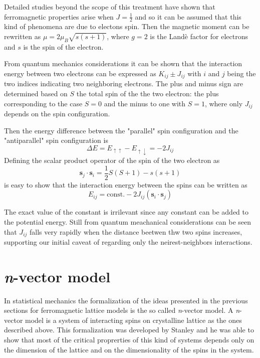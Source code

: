 Detailed studies beyond the scope of this treatment have shown that ferromagnetic
properties arise when $J=\frac{1}{2}$ and so it can be assumed that this kind of 
phenomena are due to electons spin. Then the magnetic moment can be rewritten as 
$\mu = 2 \mu_B \sqrt{s(s+1)}$, where $g=2$ is the Landè factor for electrons and
$s$ is the spin of the electron.

From quantum mechanics considerations \parencite[see][]{bransden2003physics}
it can be shown that the interaction energy between two electrons can be expressed
as $K_{ij} \pm J_{ij}$ with $i$ and $j$ being the two indices indicating two
neighboring electrons. The plus and minus sign are determined based on $S$ the 
total spin of the the two electron: the plus corresponding to the case $S=0$ and 
the minus to one with $S=1$, where only $J_{ij}$ depends on the spin configuration.

Then the energy difference between the "parallel" spin configuration and the 
"antiparallel" spin configuration is
$$\Delta E = E_{\uparrow\uparrow} - E_{\uparrow\downarrow} = -2J_{ij}$$
Defining the scalar product operator of the spin of the two electron as 
$$ \mathbf{s}_j \cdot \mathbf{s}_i = \frac{1}{2} S(S+1) - s(s+1)$$
is easy to show that the interaction energy between the spins can be written as
$$ E_{ij} = \text{const.} - 2J_{ij} (\mathbf{s}_i \cdot \mathbf{s}_j)$$

The exact value of the constant is irrilevant since any constant can be added to
the potential energy. Still from quantum meachanical considerations can be seen
that $J_{ij}$ falls very rapidly when the distance beetwen thw two spins increases,
supporting our initial caveat of regarding only the neirest-neighbors interactions.


\section{\textit{n}-vector model}

In statistical mechanics the formalization of the ideas presented in the previous
sections for ferromagnetic lattice models is the so called \textit{n}-vector model.
A \textit{n}-vector model is a system of interacting spins on crystalline lattice 
as the ones described above. This formalization was developed by Stanley
\parencite[see][]{PhysRevLett.20.589} and he was able to show that most of the
critical proprerties of this kind of systems depends only on the dimension of the
lattice and on the dimensionality of the spins in the system.


